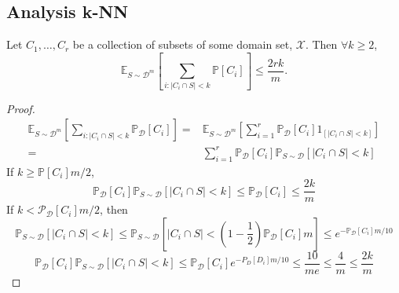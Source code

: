 \subsection{Analysis {k-NN}}%

\begin{lemma}
    Let $ C_1, \ldots, C_r $ be a collection of subsets of some domain set, $ \mathcal{X} $. Then $ \forall k \ge 2 $,
    \[
        \mathbb{E}_{S \sim \mathcal{D}^m} \left[ \sum^{}_{i: \left| C_i \cap S \right| < k} \mathbb{P} \left[ C_i \right] \right] \le \frac{2rk}{m}.
    \]
    \begin{proof}
        \begin{align*}
            \mathbb{E}_{S \sim \mathcal{D}^m} \left[ \sum^{}_{i: \left| C_i \cap S \right| < k} \mathbb{P}_{\mathcal{D}} \left[ C_i \right] \right] 
            =& \mathbb{E}_{S \sim \mathcal{D}^m} \left[ \sum^{r}_{i=1} \mathbb{P}_{\mathcal{D}}\left[ C_i \right] 1_{\left[ \left| C_i \cap S \right| < k \right]} \right]\\
            =& \sum^{r}_{i=1} \mathbb{P}_{\mathcal{D}}\left[ C_i \right] \mathbb{P}_{S \sim \mathcal{D}}\left[ \left| C_i \cap S \right| < k \right]
        \end{align*}
        If $ k \ge \mathbb{P}\left[ C_i \right] m/2 $, 
        \[
            \mathbb{P}_{\mathcal{D}}\left[ C_i \right] \mathbb{P}_{S \sim \mathcal{D}}\left[ \left| C_i \cap S \right| < k \right] \le \mathbb{P}_{\mathcal{D}} \left[ C_i \right] \le \frac{2k}{m} 
        \]
        If $ k < \mathcal{P}_{\mathcal{D}}\left[ C_i \right] m/2 $, then
        \[
            \mathbb{P}_{S \sim \mathcal{D}}\left[ \left| C_i \cap S \right| < k \right]
            \le \mathbb{P}_{S \sim \mathcal{D}}\left[ \left| C_i \cap S \right| < \left(1 - \frac{1}{2} \right)\mathbb{P}_{\mathcal{D}}\left[ C_i \right] m \right] \le e^{-\mathbb{P}_{\mathcal{D}} \left[ C_i \right] m / 10}
        \]
        \[
            \mathbb{P}_{\mathcal{D}}\left[ C_i \right] \mathbb{P}_{S \sim \mathcal{D}}\left[ \left| C_i \cap S \right| < k \right] \le \mathbb{P}_{\mathcal{D}} \left[ C_i \right] e^{-P_{D}\left[ D_i \right] m/10} \le \frac{10}{me} \le \frac{4}{m} \le \frac{2k}{m} 
        \]
    \end{proof}
\end{lemma}


